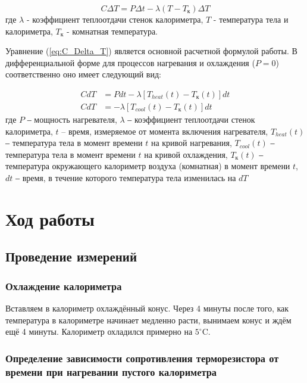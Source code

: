 \documentclass[a4paper]{article}
\begin{document}
        \begin{equation}
            C \Delta T = P \Delta t - \lambda(T - T_к) \Delta T
            \label{eq:C_Delta_T}
        \end{equation}
        где $\lambda$ - коэффициент теплоотдачи стенок калориметра, $T$ - температура тела и калориметра, $T_к$ - комнатная температура.

        Уравнение (\ref{eq:C_Delta_T}) является основной расчетной формулой работы. В дифференциальной форме для процессов нагревания и охлаждения ($P = 0$) соответственно оно имеет следующий вид:

        \begin{align}
            C dT &= P dt - \lambda \left[ T_{heat}(t) - T_к(t) \right] dt \label{eq:CdT} \\
            C dT &= - \lambda \left[ T_{cool}(t) - T_к(t) \right] dt \label{eq:CdT2}
        \end{align}
        где $P$ ‒ мощность нагревателя, $\lambda$ ‒ коэффициент теплоотдачи стенок калориметра, $t$ – время, измеряемое от момента включения нагревателя, $T_{heat}(t)$ ‒ температура тела в момент времени $t$ на кривой нагревания, $T_{cool}(t)$ ‒ температура тела в момент времени $t$ на кривой охлаждения, $T_к(t)$ ‒ температура окружающего калориметр воздуха (комнатная) в момент времени $t$, $dt$ ‒ время, в течение которого температура тела изменилась на $dT$

\section{Ход работы}

  \subsection{Проведение измерений}

    \subsubsection{Охлаждение калориметра}

        Вставляем в калориметр охлаждённый конус. Через 4 минуты после того, как температура в калориметре начинает медленно расти, вынимаем конус и ждём ещё 4 минуты. Калориметр охладился примерно на $5 ^\circ\text{C}$.

    \subsubsection{Определение зависимости сопротивления терморезистора от времени при нагревании пустого калориметра}
\end{document}
